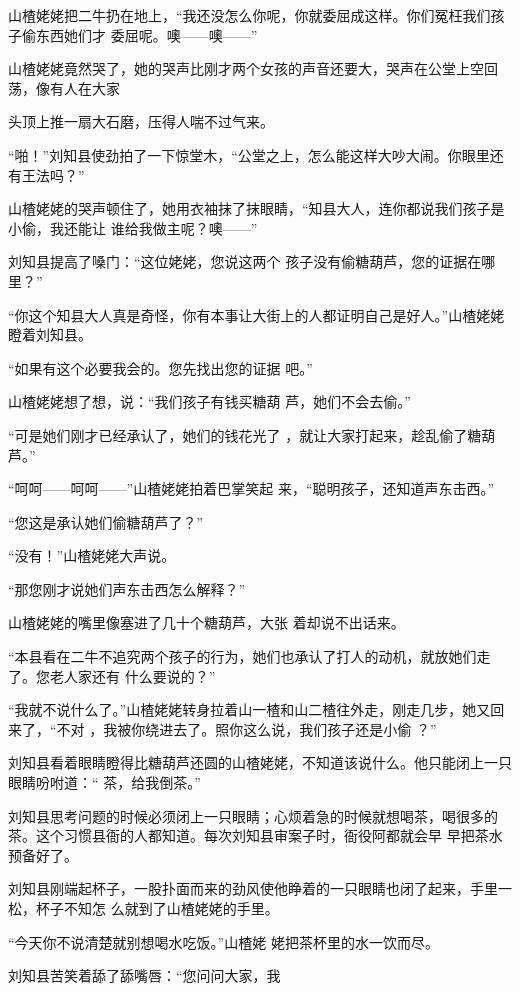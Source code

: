 \documentclass{article}
\begin{document}
山楂姥姥把二牛扔在地上，“我还没怎么你呢，你就委屈成这样。你们冤枉我们孩子偷东西她们才
委屈呢。噢——噢——” 

山楂姥姥竟然哭了，她的哭声比刚才两个女孩的声音还要大，哭声在公堂上空回荡，像有人在大家
\newpage

头顶上推一扇大石磨，压得人喘不过气来。 

“啪！”刘知县使劲拍了一下惊堂木，“公堂之上，怎么能这样大吵大闹。你眼里还有王法吗？”

山楂姥姥的哭声顿住了，她用衣袖抹了抹眼睛，“知县大人，连你都说我们孩子是小偷，我还能让
谁给我做主呢？噢——” 

刘知县提高了嗓门：“这位姥姥，您说这两个
孩子没有偷糖葫芦，您的证据在哪里？” 

“你这个知县大人真是奇怪，你有本事让大街上的人都证明自己是好人。”山楂姥姥瞪着刘知县。

“如果有这个必要我会的。您先找出您的证据
吧。” 

山楂姥姥想了想，说：“我们孩子有钱买糖葫
芦，她们不会去偷。” 

\newpage

“可是她们刚才已经承认了，她们的钱花光了
，就让大家打起来，趁乱偷了糖葫芦。” 

“呵呵——呵呵——”山楂姥姥拍着巴掌笑起
来，“聪明孩子，还知道声东击西。” 


“您这是承认她们偷糖葫芦了？” 


“没有！”山楂姥姥大声说。 


“那您刚才说她们声东击西怎么解释？” 

山楂姥姥的嘴里像塞进了几十个糖葫芦，大张
着却说不出话来。 

“本县看在二牛不追究两个孩子的行为，她们也承认了打人的动机，就放她们走了。您老人家还有
什么要说的？” 

“我就不说什么了。”山楂姥姥转身拉着山一楂和山二楂往外走，刚走几步，她又回来了，“不对
\newpage
，我被你绕进去了。照你这么说，我们孩子还是小偷
？” 

刘知县看着眼睛瞪得比糖葫芦还圆的山楂姥姥，不知道该说什么。他只能闭上一只眼睛吩咐道：“
茶，给我倒茶。” 

刘知县思考问题的时候必须闭上一只眼睛；心烦着急的时候就想喝茶，喝很多的茶。这个习惯县衙的人都知道。每次刘知县审案子时，衙役阿都就会早
早把茶水预备好了。 

刘知县刚端起杯子，一股扑面而来的劲风使他睁着的一只眼睛也闭了起来，手里一松，杯子不知怎
么就到了山楂姥姥的手里。 

“今天你不说清楚就别想喝水吃饭。”山楂姥
姥把茶杯里的水一饮而尽。 

刘知县苦笑着舔了舔嘴唇：“您问问大家，我
\end{document}
